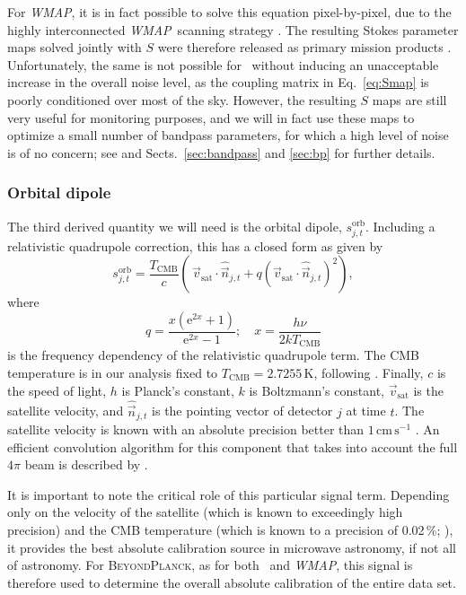 \documentclass[twocolumn]{aa}
\def\WMAP{\emph{WMAP}}
\newcommand{\n}[0]{\vec{n}}
\renewcommand{\v}[0]{\vec{v}}
\newcommand{\BP}{\textsc{BeyondPlanck}}
\newcommand{\e}{\mathrm e}
\begin{document}
For \WMAP, it is in fact possible to solve this equation
pixel-by-pixel, due to the highly interconnected \WMAP\ scanning
strategy \citep{page2007}.  The resulting Stokes parameter maps solved
jointly with $S$ were therefore released as primary mission products
\citep{bennett2012}. Unfortunately, the same is not possible for
\Planck\ without inducing an unacceptable increase in the overall
noise level, as the coupling matrix in Eq.~\eqref{eq:Smap} is poorly
conditioned over most of the sky. However, the resulting $S$ maps are
still very useful for monitoring purposes, and we will in fact use
these maps to optimize a small number of bandpass parameters, for
which a high level of noise is of no concern; see \citet{bp09} and
Sects.~\ref{sec:bandpass} and \ref{sec:bp} for further details.

\subsubsection{Orbital dipole}
\label{sec:orbital}

The third derived quantity we will need is the orbital dipole,
$s^{\mathrm{orb}}_{j,t}$. Including a relativistic quadrupole
correction, this has a closed form as given by
\begin{equation}
s^{\mathrm{orb}}_{j,t} =
\frac{T_{\mathrm{CMB}}}{c}\left(\,\v_{\mathrm{sat}} \cdot
\hat{\n}_{j,t} + q (\v_{\mathrm{sat}} \cdot
\hat{\n}_{j,t})^2\right),
\end{equation}
where
\begin{equation}
  q = \frac{x(\e^{2x}+1)}{\e^{2x}-1}; \quad x = \frac{h\nu}{2kT_{\mathrm{CMB}}}
\end{equation}
is the frequency dependency of the relativistic quadrupole term. The
CMB temperature is in our analysis fixed to
${T_{\mathrm{CMB}}=2.7255\,\textrm{K}}$, following
\citet{fixsen2009}. Finally, $c$ is the speed of light, $h$ is
Planck's constant, $k$ is Boltzmann's constant, $\v_{\mathrm{sat}}$ is
the satellite velocity, and $\hat{\n}_{j,t}$ is the pointing vector of
detector $j$ at time $t$. The satellite velocity is known with an
absolute precision better than $1\,\textrm{cm}\,\textrm{s}^{-1}$
\citep{planck2020-LVII}. An efficient convolution algorithm for this component
that takes into account the full $4\pi$ beam is described by
\citet{bp08}.

It is important to note the critical role of this particular signal
term. Depending only on the velocity of the satellite (which is known to
exceedingly high precision) and the CMB temperature (which is known to
a precision of 0.02\,\%; \citealp{fixsen2009}), it provides the best
absolute calibration source in microwave astronomy, if not all of
astronomy. For \BP, as for both \Planck\ and \WMAP, this signal is
therefore used to determine the overall absolute calibration of
the entire data set.
\end{document}

